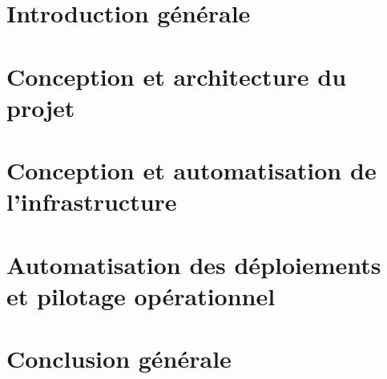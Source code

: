 \chapter{Introduction générale}
\startcontents[chap]
\clearpage


\chapter{Conception et architecture du projet}\label{chapter:objectifs_contexte}
\startcontents[chap]
\clearpage


\chapter{Conception et automatisation de l’infrastructure}\label{chapter:iac}
\startcontents[chap]
\clearpage


\chapter{Automatisation des déploiements et pilotage opérationnel}\label{chapter:cicd}
\startcontents[chap]
\clearpage

\stopcontents[chap]

\chapter*{Conclusion générale}

